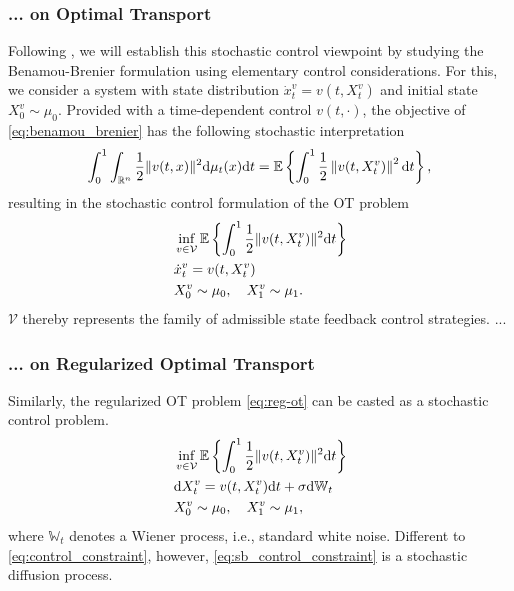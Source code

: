 \subsubsection*{... on Optimal Transport} \label{sec:background_control_ot}

Following \citet{chen2021optimal, chen2021stochastic}, we will establish this stochastic control viewpoint by studying the Benamou-Brenier formulation using elementary control considerations.
For this, we consider a system with state distribution $\dot{x}^v_t = v(t, X^v_t)$ and initial state $X^v_0 \sim \mu_0$. Provided with a time-dependent control $v(t, \cdot)$, the objective of \eqref{eq:benamou_brenier} has the following stochastic interpretation
\begin{equation*}
	\int_0^1 \int_{\mathbb{R}^n} \frac{1}{2}\lVert v(t, x)\rVert^2 \mathrm{d}\mu_t(x) \mathrm{d}t = \mathbb{E}\left\{\int_0^1 \frac{1}{2}\left\|v(t, X^v_t)\right\|^2 \mathrm{d}t\right\},
\end{equation*}
resulting in the stochastic control formulation of the OT problem 
\begin{align}
& \inf _{v \in \mathcal{V}} \mathbb{E}\left\{\int_0^1 \frac{1}{2}\lVert v(t, X^v_t)\rVert^2 \mathrm{d}t\right\} \\
\label{eq:control_constraint} & \dot{x}^v_t=v(t, X^v_t) \\
\nonumber & X^v_0 \sim \mu_0, \quad X^v_1 \sim \mu_1.
\end{align}
$\mathcal{V}$ thereby represents the family of admissible state feedback control strategies.
...

\subsubsection*{... on Regularized Optimal Transport}

Similarly, the regularized OT problem \eqref{eq:reg-ot} can be casted as a stochastic control problem.
\begin{align}
\label{eq:sb_control}
& \inf _{v \in \mathcal{V}} \mathbb{E}\left\{\int_0^1 \frac{1}{2}\lVert v(t, X^v_t)\rVert^2 \mathrm{d} t\right\}\\
\label{eq:sb_control_constraint}
& \mathrm{d} X^v_t = v(t, X^v_t) \mathrm{d} t + \sigma \mathrm{d} \mathbb{W}_t \\
\nonumber & X^v_0 \sim \mu_0, \quad X^v_1 \sim \mu_1,
\end{align}
where $\mathbb{W}_t $ denotes a Wiener process, i.e., standard white noise. 
Different to \eqref{eq:control_constraint}, however, \eqref{eq:sb_control_constraint} is a stochastic diffusion process.

